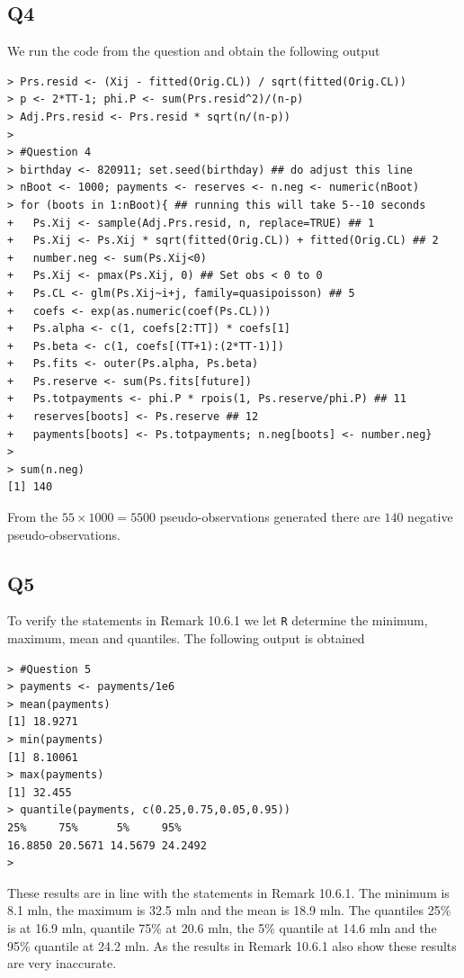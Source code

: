 \documentclass[11pt]{article}
\begin{document}
\subsection*{Q4}

We run the code from the question and obtain the following output

\begin{verbatim}
> Prs.resid <- (Xij - fitted(Orig.CL)) / sqrt(fitted(Orig.CL))
> p <- 2*TT-1; phi.P <- sum(Prs.resid^2)/(n-p)
> Adj.Prs.resid <- Prs.resid * sqrt(n/(n-p))
> 
> #Question 4
> birthday <- 820911; set.seed(birthday) ## do adjust this line
> nBoot <- 1000; payments <- reserves <- n.neg <- numeric(nBoot)
> for (boots in 1:nBoot){ ## running this will take 5--10 seconds
+   Ps.Xij <- sample(Adj.Prs.resid, n, replace=TRUE) ## 1
+   Ps.Xij <- Ps.Xij * sqrt(fitted(Orig.CL)) + fitted(Orig.CL) ## 2
+   number.neg <- sum(Ps.Xij<0)
+   Ps.Xij <- pmax(Ps.Xij, 0) ## Set obs < 0 to 0
+   Ps.CL <- glm(Ps.Xij~i+j, family=quasipoisson) ## 5
+   coefs <- exp(as.numeric(coef(Ps.CL)))
+   Ps.alpha <- c(1, coefs[2:TT]) * coefs[1]
+   Ps.beta <- c(1, coefs[(TT+1):(2*TT-1)])
+   Ps.fits <- outer(Ps.alpha, Ps.beta)
+   Ps.reserve <- sum(Ps.fits[future])
+   Ps.totpayments <- phi.P * rpois(1, Ps.reserve/phi.P) ## 11
+   reserves[boots] <- Ps.reserve ## 12
+   payments[boots] <- Ps.totpayments; n.neg[boots] <- number.neg}
> 
> sum(n.neg)
[1] 140
\end{verbatim}

From the $55 \times 1000 = 5500$ pseudo-observations generated there are $140$ negative pseudo-observations.

\subsection*{Q5}
To verify the statements in Remark 10.6.1 we let \verb|R| determine the minimum, maximum, mean and quantiles. The following output is obtained

\begin{verbatim}
> #Question 5
> payments <- payments/1e6
> mean(payments)
[1] 18.9271
> min(payments)
[1] 8.10061
> max(payments)
[1] 32.455
> quantile(payments, c(0.25,0.75,0.05,0.95))
25%     75%      5%     95% 
16.8850 20.5671 14.5679 24.2492 
>
\end{verbatim}

These results are in line with the statements in Remark 10.6.1. The minimum is 8.1 mln, the maximum is 32.5 mln and the mean is 18.9 mln. The quantiles 25\% is at 16.9 mln, quantile 75\% at 20.6 mln, the 5\% quantile at 14.6 mln and the 95\% quantile at 24.2 mln. As the results in Remark 10.6.1 also show these results are very inaccurate.
\end{document}
